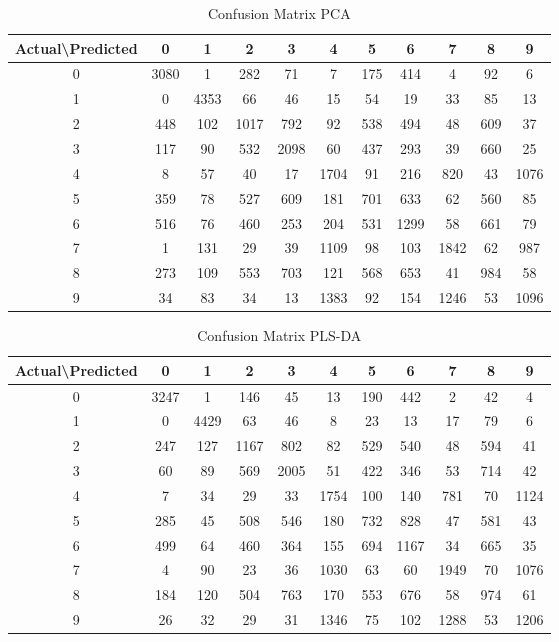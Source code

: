 \begin{table}[h!]
\begin{tabular}{|c|c|c|c|c|c|c|c|c|c|c|}
    \hline
    Actual\textbackslash Predicted & 0 & 1 & 2 & 3 & 4 & 5 & 6 & 7 & 8 & 9 \\
    \hline
    0 & 3080 & 1 & 282 & 71 & 7 & 175 & 414 & 4 & 92 & 6 \\
    \hline
    1 & 0 & 4353 & 66 & 46 & 15 & 54 & 19 & 33 & 85 & 13 \\
    \hline
    2 & 448 & 102 & 1017 & 792 & 92 & 538 & 494 & 48 & 609 & 37 \\
    \hline
    3 & 117 & 90 & 532 & 2098 & 60 & 437 & 293 & 39 & 660 & 25 \\
    \hline
    4 & 8 & 57 & 40 & 17 & 1704 & 91 & 216 & 820 & 43 & 1076 \\
    \hline
    5 & 359 & 78 & 527 & 609 & 181 & 701 & 633 & 62 & 560 & 85 \\
    \hline
    6 & 516 & 76 & 460 & 253 & 204 & 531 & 1299 & 58 & 661 & 79 \\
    \hline
    7 & 1 & 131 & 29 & 39 & 1109 & 98 & 103 & 1842 & 62 & 987 \\
    \hline
    8 & 273 & 109 & 553 & 703 & 121 & 568 & 653 & 41 & 984 & 58 \\
    \hline
    9 & 34 & 83 & 34 & 13 & 1383 & 92 & 154 & 1246 & 53 & 1096 \\
    \hline
\end{tabular}
\caption{Confusion Matrix PCA}
\end{table}

\begin{table}[h!]
\begin{tabular}{|c|c|c|c|c|c|c|c|c|c|c|}
    \hline
    Actual\textbackslash Predicted & 0 & 1 & 2 & 3 & 4 & 5 & 6 & 7 & 8 & 9 \\
    \hline
    0 & 3247 & 1 & 146 & 45 & 13 & 190 & 442 & 2 & 42 & 4 \\
    \hline
    1 & 0 & 4429 & 63 & 46 & 8 & 23 & 13 & 17 & 79 & 6 \\
    \hline
    2 & 247 & 127 & 1167 & 802 & 82 & 529 & 540 & 48 & 594 & 41 \\
    \hline
    3 & 60 & 89 & 569 & 2005 & 51 & 422 & 346 & 53 & 714 & 42 \\
    \hline
    4 & 7 & 34 & 29 & 33 & 1754 & 100 & 140 & 781 & 70 & 1124 \\
    \hline
    5 & 285 & 45 & 508 & 546 & 180 & 732 & 828 & 47 & 581 & 43 \\
    \hline
    6 & 499 & 64 & 460 & 364 & 155 & 694 & 1167 & 34 & 665 & 35 \\
    \hline
    7 & 4 & 90 & 23 & 36 & 1030 & 63 & 60 & 1949 & 70 & 1076 \\
    \hline
    8 & 184 & 120 & 504 & 763 & 170 & 553 & 676 & 58 & 974 & 61 \\
    \hline
    9 & 26 & 32 & 29 & 31 & 1346 & 75 & 102 & 1288 & 53 & 1206 \\
    \hline
\end{tabular}
\caption{Confusion Matrix PLS-DA}
\end{table}

